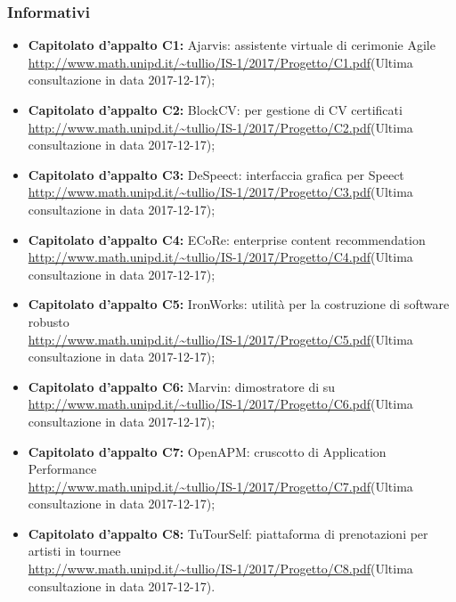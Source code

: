 		\subsubsection{Informativi}
		\begin{itemize}
 			\item \textbf{Capitolato d'appalto C1:} Ajarvis: assistente virtuale di cerimonie Agile \\ \url{http://www.math.unipd.it/~tullio/IS-1/2017/Progetto/C1.pdf}(Ultima consultazione in data {2017-12-17});
 			\item \textbf{Capitolato d'appalto C2:} BlockCV:  per gestione di CV certificati \\ \url{http://www.math.unipd.it/~tullio/IS-1/2017/Progetto/C2.pdf}(Ultima consultazione in data {2017-12-17});
 			\item \textbf{Capitolato d'appalto C3:} DeSpeect: interfaccia grafica per Speect \\ \url{http://www.math.unipd.it/~tullio/IS-1/2017/Progetto/C3.pdf}(Ultima consultazione in data {2017-12-17});
 			\item \textbf{Capitolato d'appalto C4:} ECoRe: enterprise content recommendation \\ \url{http://www.math.unipd.it/~tullio/IS-1/2017/Progetto/C4.pdf}(Ultima consultazione in data {2017-12-17});
 			\item \textbf{Capitolato d'appalto C5:} IronWorks: utilità per la costruzione di software robusto \\ \url{http://www.math.unipd.it/~tullio/IS-1/2017/Progetto/C5.pdf}(Ultima consultazione in data {2017-12-17});
 			\item \textbf{Capitolato d'appalto C6:} Marvin: dimostratore di  su  \\ \url{http://www.math.unipd.it/~tullio/IS-1/2017/Progetto/C6.pdf}(Ultima consultazione in data {2017-12-17});
 			\item \textbf{Capitolato d'appalto C7:} OpenAPM: cruscotto di Application Performance  \\ \url{http://www.math.unipd.it/~tullio/IS-1/2017/Progetto/C7.pdf}(Ultima consultazione in data {2017-12-17});
 			\item \textbf{Capitolato d'appalto C8:} TuTourSelf: piattaforma di prenotazioni per artisti in tournee \\ \url{http://www.math.unipd.it/~tullio/IS-1/2017/Progetto/C8.pdf}(Ultima consultazione in data {2017-12-17}).
 			
		\end{itemize}
		


